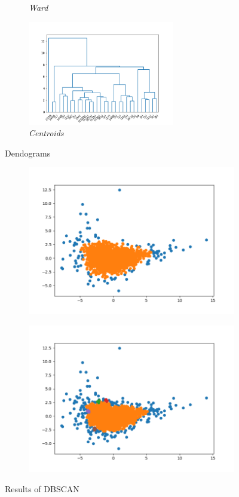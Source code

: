 \begin{figure}[h!]
\begin{subfigure}{0.49\textwidth}
        \caption{\emph{Ward}}
        \label{fig:ward_img}
    \end{subfigure}
    \begin{subfigure}{0.49\textwidth}
         \centering
         \includegraphics[width=0.7\textwidth]{img/clustering/centroid.png}
         \caption{\emph{Centroids}}
         \label{fig:centr_img}
     \end{subfigure}
     \caption{Dendograms}
    \label{fig:dendograms}
\end{figure}

\begin{figure}[h!]
	\captionsetup{justification=centering}
	\centering
	\begin{subfigure}{0.49\textwidth}
		\includegraphics[width=.65\textwidth]{img/clustering/dbscan.png}
		\centering
		\label{fig:dbscan_good}
	\end{subfigure}
	\begin{subfigure}{0.49\textwidth}
		\includegraphics[width=.65\textwidth]{img/clustering/dbscan_bad.png}
		\centering
		\label{fig:dbscan_bad}
	\end{subfigure}
	\caption{Results of DBSCAN}
	\label{fig:dbscan}
\end{figure}


